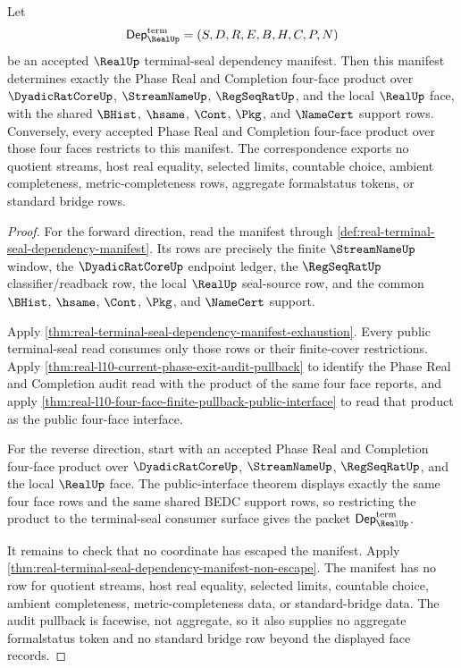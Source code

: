 \begin{theorem}
\label{thm:real-terminal-seal-dependency-manifest-phase-exit-face-product}
Let
$$
\mathsf{Dep}_{\RealUp}^{\mathrm{term}}=(S,D,R,E,B,H,C,P,N)
$$
be an accepted $\RealUp$ terminal-seal dependency manifest. Then this manifest
determines exactly the Phase Real and Completion four-face product over
$\DyadicRatCoreUp$, $\StreamNameUp$, $\RegSeqRatUp$, and the local $\RealUp$
face, with the shared $\BHist$, $\hsame$, $\Cont$, $\Pkg$, and $\NameCert$
support rows. Conversely, every accepted Phase Real and Completion four-face
product over those four faces restricts to this manifest. The correspondence
exports no quotient streams, host real equality, selected limits, countable
choice, ambient completeness, metric-completeness rows, aggregate formalstatus
tokens, or standard bridge rows.
\end{theorem}
\begin{proof}
For the forward direction, read the manifest through
\autoref{def:real-terminal-seal-dependency-manifest}. Its rows are precisely the
finite $\StreamNameUp$ window, the $\DyadicRatCoreUp$ endpoint ledger, the
$\RegSeqRatUp$ classifier/readback row, the local $\RealUp$ seal-source row, and
the common $\BHist$, $\hsame$, $\Cont$, $\Pkg$, and $\NameCert$ support.

Apply \autoref{thm:real-terminal-seal-dependency-manifest-exhaustion}. Every
public terminal-seal read consumes only those rows or their finite-cover
restrictions. Apply
\autoref{thm:real-l10-current-phase-exit-audit-pullback} to identify the Phase
Real and Completion audit read with the product of the same four face reports,
and apply \autoref{thm:real-l10-four-face-finite-pullback-public-interface} to
read that product as the public four-face interface.

For the reverse direction, start with an accepted Phase Real and Completion
four-face product over $\DyadicRatCoreUp$, $\StreamNameUp$, $\RegSeqRatUp$, and
the local $\RealUp$ face. The public-interface theorem displays exactly the
same four face rows and the same shared BEDC support rows, so restricting the
product to the terminal-seal consumer surface gives the packet
$\mathsf{Dep}_{\RealUp}^{\mathrm{term}}$.

It remains to check that no coordinate has escaped the manifest. Apply
\autoref{thm:real-terminal-seal-dependency-manifest-non-escape}. The manifest
has no row for quotient streams, host real equality, selected limits, countable
choice, ambient completeness, metric-completeness data, or standard-bridge
data. The audit pullback is facewise, not aggregate, so it also supplies no
aggregate formalstatus token and no standard bridge row beyond the displayed
face records.
\end{proof}


